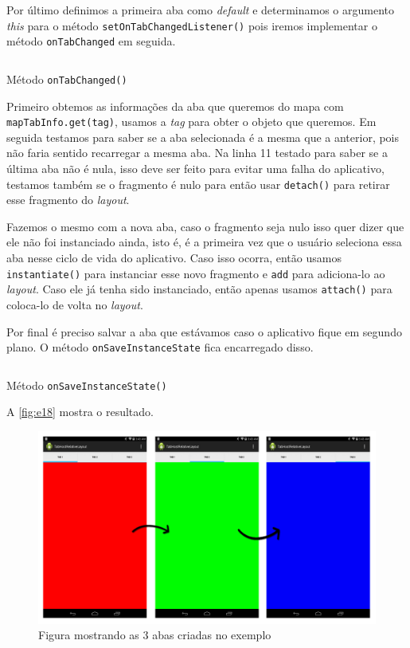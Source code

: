 \documentclass[a4paper,12pt,brazil,oneside]{book}
\begin{document}
	Por último definimos a primeira aba como \emph{default} e determinamos o argumento \emph{this} para o método \texttt{setOnTabChangedListener()} pois iremos implementar o método \texttt{onTabChanged} em seguida.
	
	\begin{listing}[H]
	\inputminted[linenos=true,fontsize=\small,frame=lines, framesep=2mm, tabsize=2,numbersep=5pt]{java}{src/design/ontabchanged.java}
	\caption{Método \texttt{onTabChanged()}}
	\end{listing}
	
	Primeiro obtemos as informações da aba que queremos do mapa com \texttt{mapTabInfo.get(tag)}, usamos a \emph{tag} para obter o objeto que queremos. Em seguida testamos para saber se a aba selecionada é a mesma que a anterior, pois não faria sentido recarregar a mesma aba. Na linha 11 testado para saber se a última aba não é nula, isso deve ser feito para evitar uma falha do aplicativo, testamos também se o fragmento é nulo para então usar \texttt{detach()} para retirar esse fragmento do \emph{layout}. 
	
	Fazemos o mesmo com a nova aba, caso o fragmento seja nulo isso quer dizer que ele não foi instanciado ainda, isto é, é a primeira vez que o usuário seleciona essa aba nesse ciclo de vida do aplicativo. Caso isso ocorra, então usamos \texttt{instantiate()} para instanciar esse novo fragmento e \texttt{add} para adiciona-lo ao \emph{layout}. Caso ele já tenha sido instanciado, então apenas usamos \texttt{attach()} para coloca-lo de volta no \emph{layout}.
	
	Por final é preciso salvar a aba que estávamos caso o aplicativo fique em segundo plano. O método \texttt{onSaveInstanceState} fica encarregado disso.
	
	\begin{listing}[H]
	\inputminted[linenos=true,fontsize=\small,frame=lines, framesep=2mm, tabsize=2,numbersep=5pt]{java}{src/design/onsavetab.java}
	\caption{Método \texttt{onSaveInstanceState()}}
	\end{listing}
	
	A \autoref{fig:e18} mostra o resultado.
	
	\begin{figure}[H]
	  \centering
	  \includegraphics[width=1\textwidth]{figuras/design/tabs-rgb.jpg}
	  \caption{Figura mostrando as 3 abas criadas no exemplo}
	  \label{fig:e18}
	\end{figure}
	
\end{document}
